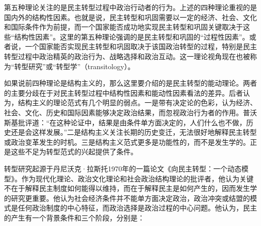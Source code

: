 
第五种理论关注的是民主转型过程中政治行动者的行为。上述的四种理论重视的是国内外的结构性因素。也就是说，民主转型和巩固需要以一定的经济、社会、文化和国际条件作为前提，而一个国家能否成功地实现民主转型和巩固关键取决于这些“结构性因素”。这里的第五种理论强调的是民主转型和巩固的“过程性因素”。或者说，一个国家能否实现民主转型和巩固取决于该国政治转型的过程，特别是民主转型过程中政治精英的政治行为、战略选择和政治互动。这一理论视角现在也被称为“转型研究”或“转型学”（transitology）。

如果说前四种理论是结构主义的，那么这里要介绍的是民主转型的能动理论。两者的主要分歧在于对民主转型过程中结构性因素和能动性因素看法的差异。后者认为，结构主义的理论范式有几个明显的弱点。一是带有决定论的色彩，认为经济、社会、文化、历史和国际因素能够决定政治结果，而忽视政治行为者的作用。普沃斯基批评道：“在这种论证中，结果是由条件单方面决定的，人们什么也不做，历史还是会这样发展。”二是结构主义关注长期的历史变迁，无法很好地解释民主转型或政治变革发生的时机。三是结构主义范式更多是功能性的，而不是发生学的。正是这些不足为转型范式的兴起提供了条件。

转型研究起源于丹尼沃克·拉斯托1970年的一篇论文《向民主转型：一个动态模型》。作为现代化理论、政治文化理论和社会政治结构理论的批评者，他认为关键不在于解释民主制度如何能得以维持，而在于解释民主是如何产生的，因而发生学的研究更重要。他认为社会经济条件并不能单方面决定政治，政治冲突或结盟的模式是任何政治制度的中心特征，而政治选择是政治过程的中心问题。他认为，民主的产生有一个背景条件和三个阶段，分别是：


